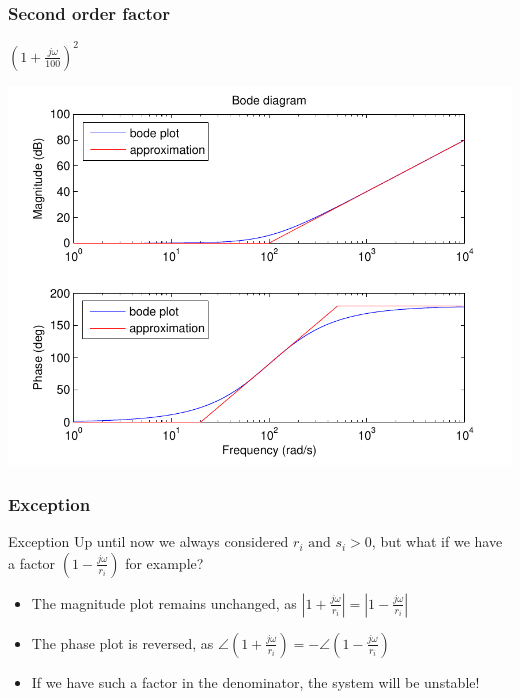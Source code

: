 \begin{frame}
\frametitle{Second order factor}
$(1+\frac{j\omega}{100})^2$

\begin{center}
\includegraphics[scale=0.5]{BodeSecondOrder}
\end{center}


\end{frame}


\begin{frame}
\frametitle{Exception}
\begin{alertblock}{Exception}
	Up until now we always considered $r_i \text{ and } s_i > 0$, but what if we have a factor $(1-\frac{j\omega}{r_i})$ for example?
	\begin{itemize}
		\item The magnitude plot remains unchanged, as $|1+\frac{j\omega}{r_i}| = |1 - \frac{j\omega}{r_i} |$
		\item The phase plot is reversed, as $\angle(1+\frac{j\omega}{r_i}) = -\angle(1 - \frac{j\omega}{r_i})$
		\item If we have such a factor in the denominator, the system will be unstable!
	\end{itemize}
	
\end{alertblock}

\end{frame}



